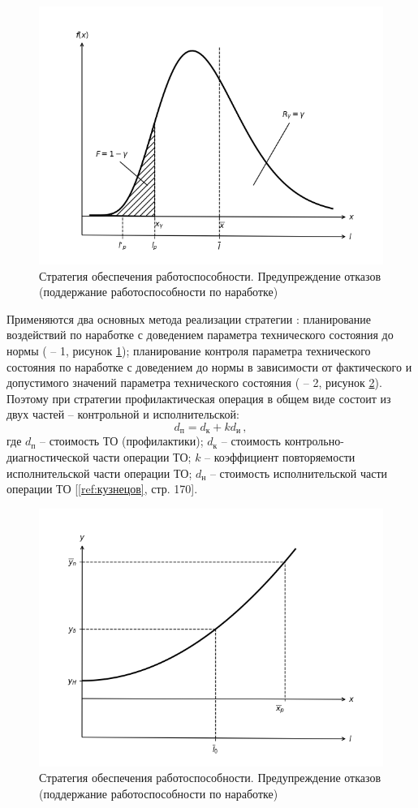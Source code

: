 \documentclass[../nirs.tex]{subfiles}
\begin{document}
\begin{figure}[H]
\centering
\includegraphics[keepaspectratio,width=\textwidth]{./images/pdf.b.png}
\caption{Стратегия обеспечения работоспособности. Предупреждение отказов
    (поддержание работоспособности по наработке)}
\label{fig:pdf.b}
\end{figure}

Применяются два основных метода реализации стратегии : планирование
воздействий по наработке с доведением параметра технического состояния до нормы
( -- 1, рисунок \ref{fig:pdf.b}); планирование контроля параметра
технического состояния по наработке с доведением до нормы в зависимости от
фактического и допустимого значений параметра технического состояния ( --
2, рисунок \ref{fig:pdf.c}). Поэтому при стратегии  профилактическая
операция в общем виде состоит из двух частей -- контрольной и исполнительской:
\begin{equation*}
    d_{\text{п}} = d_{\text{к}} + k d_{\text{и}}\,,
\end{equation*}
где $d_{\text{п}}$ -- стоимость ТО (профилактики); $d_{\text{к}}$ -- стоимость
контрольно-диагностической части операции ТО; $k$ -- коэффициент повторяемости
исполнительской части операции ТО; $d_{\text{н}}$ -- стоимость исполнительской
части операции ТО [\ref{ref:кузнецов}, стр. 170].

\begin{figure}[H]
\centering
\includegraphics[keepaspectratio,width=\textwidth]{./images/pdf.c.png}
\caption{Стратегия обеспечения работоспособности. Предупреждение отказов
    (поддержание работоспособности по наработке)}
\label{fig:pdf.c}
\end{figure}
\end{document}
